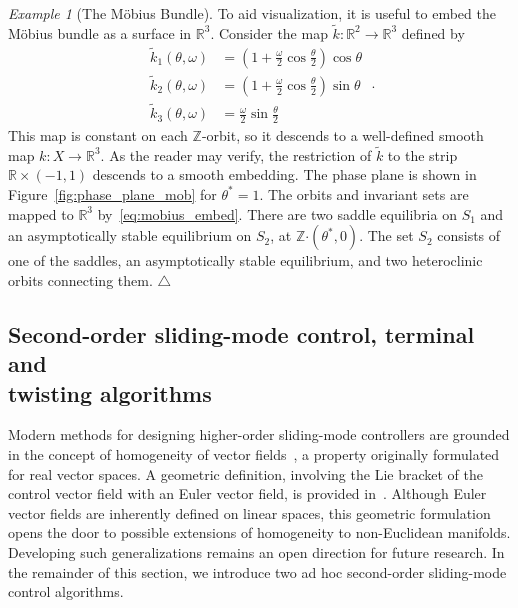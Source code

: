 \documentclass{article}
\theoremstyle{definition}
\theoremstyle{remark}
\newtheorem{example}{Example}
\newcommand{\bscdot}{\boldsymbol{\cdot}}
\newcommand\xqed[1]{%
  \leavevmode\unskip\penalty9999 \hbox{}\nobreak\hfill
  \quad\hbox{#1}}
\newcommand\eexa{\xqed{$\triangle$}}
\newcommand{\IN}{\mathbb{Z}}	%
\newcommand{\MA}{X}	%
\newcommand{\RR}{\mathbb{R}}	%
\newcommand{\SW}{S}	%
\begin{document}
\begin{example}[The M\"obius Bundle]
 To aid visualization, it is useful to embed the M\"obius bundle as a surface in $\RR^3$. Consider the map
 $\tilde{k}: \RR^2 \to \RR^3$ defined by
 \begin{equation} \label{eq:mobius_embed}
 \begin{aligned}
  \tilde{k}_1(\theta,\omega) &= \left( 1 + \frac{\omega}{2}\cos \frac{\theta}{2} \right) \cos \theta \\
  \tilde{k}_2(\theta,\omega) &= \left( 1 + \frac{\omega}{2}\cos \frac{\theta}{2} \right) \sin \theta \\
  \tilde{k}_3(\theta,\omega) &= \frac{\omega}{2}\sin \frac{\theta}{2}
 \end{aligned} \;.
 \end{equation}
 This map is constant on each $\IN$-orbit, so it descends to a well-defined smooth map $k : \MA \to \RR^3$.
 As the reader may verify, the restriction of $\tilde{k}$ to the strip $\RR \times (-1, 1)$ descends to a
 smooth embedding. The phase plane is shown in Figure~\ref{fig:phase_plane_mob} for $\theta^* = 1$. The orbits 
 and invariant sets are mapped to $\RR^3$ by~\eqref{eq:mobius_embed}. There are two saddle equilibria on $\SW_1$
 and an asymptotically stable equilibrium on $\SW_2$, at $\IN\bscdot(\theta^*,0)$. The set $\SW_2$ consists 
 of one of the saddles, an asymptotically stable equilibrium, and two heteroclinic orbits connecting them.
 \eexa
\end{example}

\subsection{Second-order sliding-mode control, terminal and \\ twisting algorithms}

Modern methods for designing higher-order sliding-mode controllers are grounded in the concept of homogeneity
of vector fields~\cite{levant2005}, a property originally formulated for real vector spaces. A geometric definition,
involving the Lie bracket of the control vector field with an Euler vector field, is provided in~\cite{bacciotti,bhat2005}.
Although Euler vector fields are inherently defined on linear spaces, this geometric formulation opens the door
to possible extensions of homogeneity to non-Euclidean manifolds. Developing such generalizations remains
an open direction for future research. In the remainder of this section, we introduce two ad hoc second-order
sliding-mode control algorithms.
\end{document}
